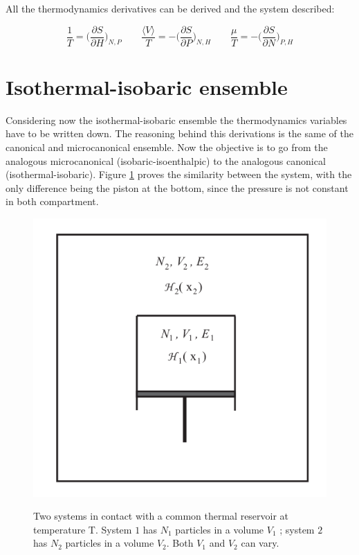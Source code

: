 	All the thermodynamics derivatives can be derived and the system described:

	$$\frac{1}{T} = \biggl(\frac{\partial S}{\partial H}\biggr)_{N, P}\qquad \frac{\langle V\rangle}{T} = -\biggl(\frac{\partial S}{\partial P}\biggr)_{N, H}\qquad \frac{\mu}{T} = -\biggl(\frac{\partial S}{\partial N}\biggr)_{P, H}$$

\section{Isothermal-isobaric ensemble}
Considering now the isothermal-isobaric ensemble the thermodynamics variables have to be written down.
The reasoning behind this derivations is the same of the canonical and microcanonical ensemble.
Now the objective is to go from the analogous microcanonical (isobaric-isoenthalpic) to the analogous canonical (isothermal-isobaric).
Figure \ref{fig:isobar} proves the similarity between the system, with the only difference being the piston at the bottom, since the pressure is not constant in both compartment.

\begin{figure}
\center
\includegraphics[scale=0.4]{isobar}
\label{fig:isobar}
\caption{Two systems in contact with a common thermal reservoir at temperature T. System
$1$ has $N_1$ particles in a volume $V_1$ ; system $2$ has $N_2$ particles in a volume $V_2$. Both $V_1$ and $V_2$ can vary.}
\end{figure}

